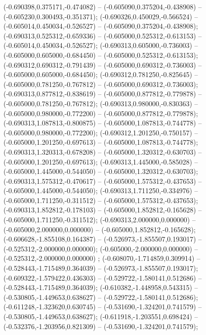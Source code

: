  (-0.690398,0.375171,-0.474082) -- (-0.605090,0.375204,-0.438908) -- (-0.605230,0.300493,-0.351371);
 (-0.690326,0.450029,-0.566524) -- (-0.605014,0.450034,-0.526527) -- (-0.605090,0.375204,-0.438908);
 (-0.690313,0.525312,-0.659336) -- (-0.605000,0.525312,-0.613153) -- (-0.605014,0.450034,-0.526527);
 (-0.690313,0.605000,-0.736003) -- (-0.605000,0.605000,-0.684450) -- (-0.605000,0.525312,-0.613153);
 (-0.690312,0.690312,-0.791439) -- (-0.605000,0.690312,-0.736003) -- (-0.605000,0.605000,-0.684450);
 (-0.690312,0.781250,-0.825645) -- (-0.605000,0.781250,-0.767812) -- (-0.605000,0.690312,-0.736003);
 (-0.690313,0.877812,-0.838619) -- (-0.605000,0.877812,-0.779878) -- (-0.605000,0.781250,-0.767812);
 (-0.690313,0.980000,-0.830363) -- (-0.605000,0.980000,-0.772200) -- (-0.605000,0.877812,-0.779878);
 (-0.690313,1.087813,-0.800875) -- (-0.605000,1.087813,-0.744778) -- (-0.605000,0.980000,-0.772200);
 (-0.690312,1.201250,-0.750157) -- (-0.605000,1.201250,-0.697613) -- (-0.605000,1.087813,-0.744778);
 (-0.690313,1.320313,-0.678208) -- (-0.605000,1.320312,-0.630703) -- (-0.605000,1.201250,-0.697613);
 (-0.690313,1.445000,-0.585028) -- (-0.605000,1.445000,-0.544050) -- (-0.605000,1.320312,-0.630703);
 (-0.690313,1.575312,-0.470617) -- (-0.605000,1.575312,-0.437653) -- (-0.605000,1.445000,-0.544050);
 (-0.690313,1.711250,-0.334976) -- (-0.605000,1.711250,-0.311512) -- (-0.605000,1.575312,-0.437653);
 (-0.690313,1.852812,-0.178103) -- (-0.605000,1.852812,-0.165628) -- (-0.605000,1.711250,-0.311512);
 (-0.690313,2.000000,0.000000) -- (-0.605000,2.000000,0.000000) -- (-0.605000,1.852812,-0.165628);
 (-0.606628,-1.855108,0.164387) -- (-0.526973,-1.855507,0.193017) -- (-0.525312,-2.000000,0.000000);
 (-0.605000,-2.000000,0.000000) -- (-0.525312,-2.000000,0.000000) ;
 (-0.608070,-1.714859,0.309914) -- (-0.528443,-1.715489,0.364039) -- (-0.526973,-1.855507,0.193017);
 (-0.609322,-1.579422,0.436303) -- (-0.529722,-1.580141,0.512686) -- (-0.528443,-1.715489,0.364039);
 (-0.610382,-1.448958,0.543315) -- (-0.530805,-1.449653,0.638627) -- (-0.529722,-1.580141,0.512686);
 (-0.611248,-1.323620,0.630745) -- (-0.531690,-1.324201,0.741579) -- (-0.530805,-1.449653,0.638627);
 (-0.611918,-1.203551,0.698424) -- (-0.532376,-1.203956,0.821309) -- (-0.531690,-1.324201,0.741579);
